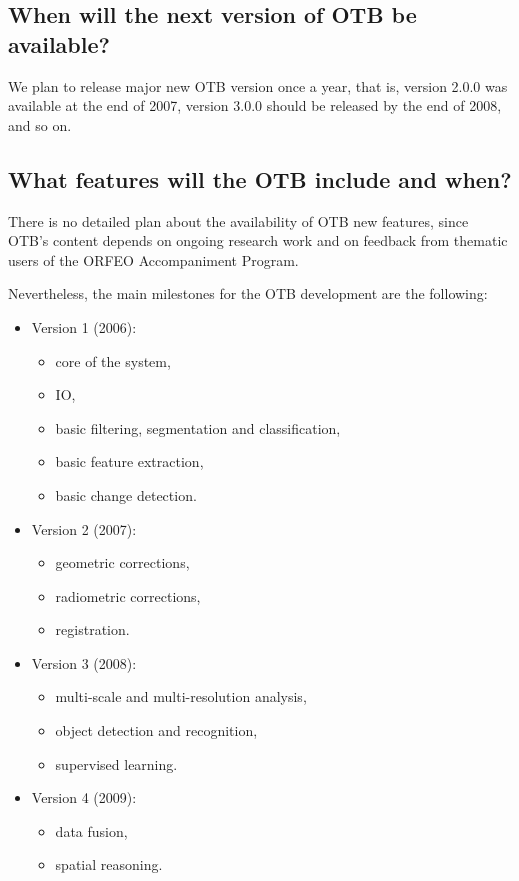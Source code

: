 \subsection{When will the next version of OTB be available?}
We plan to release major new OTB version once a year, that is, version
2.0.0 was available at the end of 2007, version 3.0.0 should be released
by the end of 2008, and so on.

\subsection{What features will the OTB include and when?}
There is no detailed plan about the availability of OTB new features,
since OTB's content depends on ongoing research work and on feedback
from thematic users of the ORFEO Accompaniment Program.

Nevertheless, the main milestones for the OTB development are the
following:
\begin{itemize}
  \item{Version 1 (2006):}
    \begin{itemize}
    \item core of the system,
    \item IO,
    \item basic filtering, segmentation and classification,
    \item basic feature extraction,
    \item basic change detection.
    \end{itemize}
    \item{Version 2 (2007):}
      \begin{itemize}
      \item geometric corrections,
      \item radiometric corrections,
      \item registration.
      \end{itemize}
    \item{Version 3 (2008):}
      \begin{itemize}
      \item multi-scale and multi-resolution analysis,
      \item object detection and recognition,
      \item supervised learning.
      \end{itemize}
    \item{Version 4 (2009):}
      \begin{itemize}
	\item data fusion,
	\item spatial reasoning.
      \end{itemize}
    
\end{itemize}

